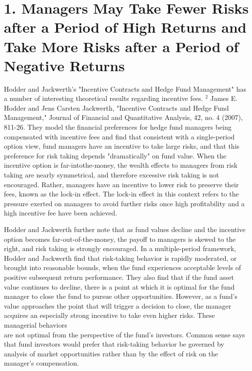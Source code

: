 \documentclass[11pt]{article}
\begin{document}
\section*{1. Managers May Take Fewer Risks after a Period of High Returns and Take More Risks after a Period of Negative Returns}
Hodder and Jackwerth's "Incentive Contracts and Hedge Fund Management" has a number of interesting theoretical results regarding incentive fees. ${ }^{2}$ James E. Hodder and Jens Carsten Jackwerth, "Incentive Contracts and Hedge Fund Management," Journal of Financial and Quantitative Analysis, 42, no. 4 (2007), 811-26. They model the financial preferences for hedge fund managers being compensated with incentive fees and find that consistent with a single-period option view, fund managers have an incentive to take large risks, and that this preference for risk taking depends "dramatically" on fund value. When the incentive option is far-intothe-money, the wealth effects to managers from risk taking are nearly symmetrical, and therefore excessive risk taking is not encouraged. Rather, managers have an incentive to lower risk to preserve their fees, known as the lock-in effect. The lock-in effect in this context refers to the pressure exerted on managers to avoid further risks once high profitability and a high incentive fee have been achieved.

Hodder and Jackwerth further note that as fund values decline and the incentive option becomes far-out-of-the-money, the payoff to managers is skewed to the right, and risk taking is strongly encouraged. In a multiple-period framework, Hodder and Jackwerth find that risk-taking behavior is rapidly moderated, or brought into reasonable bounds, when the fund experiences acceptable levels of positive subsequent return performance. They also find that if the fund asset value continues to decline, there is a point at which it is optimal for the fund manager to close the fund to pursue other opportunities. However, as a fund's value approaches the point that will trigger a decision to close, the manager acquires an especially strong incentive to take even higher risks. These managerial behaviors\\
are not optimal from the perspective of the fund's investors. Common sense says that fund investors would prefer that risk-taking behavior be governed by analysis of market opportunities rather than by the effect of risk on the manager's compensation.
\end{document}
